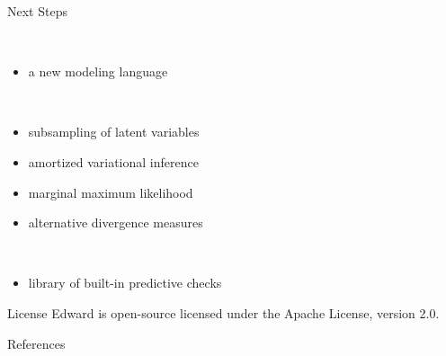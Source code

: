 \documentclass{beamer}
\begin{document}
\begin{frame}[t]
\begin{columns}[t,totalwidth=10in]
\begin{column}{\onecolwid}
\begin{block}{Next Steps}
\vspace*{0.5in}

\\
\begin{itemize}
  \item a new modeling language
\end{itemize}

\vspace*{0.5in}

\\
\begin{itemize}
  \item subsampling of latent variables
  \item amortized variational inference
  \item marginal maximum likelihood
  \item alternative divergence measures
\end{itemize}

\vspace*{0.5in}

\\
\begin{itemize}
  \item library of built-in predictive checks
\end{itemize}

\end{block}

\begin{block}{License}
Edward is open-source licensed under the Apache License, version 2.0.
\end{block}

\begin{block}{References}
\small{


}
\end{block}

\end{column} 

\end{columns} %
\end{frame}   %
\end{document}
